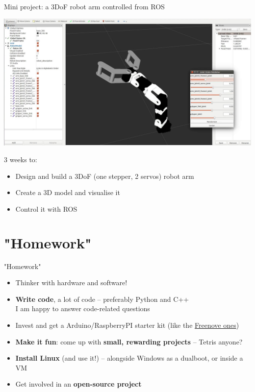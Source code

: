 \documentclass[compress]{beamer}
\makeatletter
\let\beamer@writeslidentry@miniframeson=\beamer@writeslidentry
\def\beamer@writeslidentry@miniframesoff{%
  \expandafter\beamer@ifempty\expandafter{\beamer@framestartpage}{}%
  {%
    \clearpage\beamer@notesactions%
  }
}
\newcommand*{\miniframeson}{\let\beamer@writeslidentry=\beamer@writeslidentry@miniframeson}
\newcommand*{\miniframesoff}{\let\beamer@writeslidentry=\beamer@writeslidentry@miniframesoff}
\makeatother
\begin{document}
\begin{frame}{Mini project: a 3DoF robot arm controlled from ROS}
    \begin{center}
        \includegraphics[width=0.8\linewidth]{arm-rviz}
    \end{center}

    3 weeks to:

    \begin{itemize}
        \item Design and build a 3DoF (one stepper, 2 servos) robot arm
        \item Create a 3D model and visualise it
        \item Control it with ROS
    \end{itemize}

\end{frame}

\section[]{"Homework"}

\miniframesoff


\miniframeson

\begin{frame}{"Homework"}
    \begin{itemize}
        \item<+-> Thinker with hardware and software!
        \item<+-> \textbf{Write code}, a lot of code -- preferably Python and C++ \\
                I am happy to answer code-related questions
        \item<+-> Invest  and get a Arduino/RaspberryPI starter kit (like the \href{https://www.amazon.co.uk/s?merchant=A3DM8VCGJL5PKR&fallThrough=1}{Freenove ones})
        \item<+-> \textbf{Make it fun}: come up with \textbf{small, rewarding projects} -- Tetris anyone?
        \item<+-> \textbf{Install Linux} (and use it!) -- alongside Windows as a dualboot, or inside a VM
        \item<+-> Get involved in an \textbf{open-source project}

    \end{itemize}
\end{frame}
\end{document}
